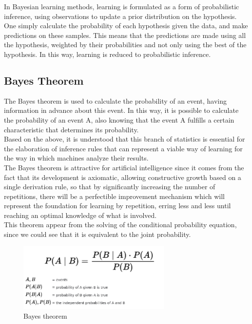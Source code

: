 \documentclass[sigconf,12pt,review=false,natbib=false]{acmart}
\begin{document}
In Bayesian learning methods, learning is formulated as a form of probabilistic inference, using observations to
update a prior distribution on the hypothesis.
One simply calculate the probability of each hypothesis given the data, and make predictions on these samples.
This means that the predictions are made using all the hypothesis, weighted by their probabilities and not only
using the best of the hypothesis. In this way, learning is reduced to probabilistic inference.


\subsection{Bayes Theorem}

The Bayes theorem is used to calculate the probability of an event, having information in advance
about this event. In this way, it is possible to calculate the probability of an event A, also
knowing that the event A fulfills a certain characteristic that determines its probability. \\

Based on the above, it is understood that this branch of statistics is essential for the elaboration
of inference rules that can represent a viable way of learning for the way in which machines analyze
their results. \\

The Bayes theorem is attractive for artificial intelligence since it comes from the fact that its
development is axiomatic, allowing constructive growth based on a single derivation rule, so that by
significantly increasing the number of repetitions, there will be a perfectible improvement mechanism
which will represent the foundation for learning by repetition, erring less and less until reaching
an optimal knowledge of what is involved. \\


This theorem appear from the solving of the conditional probability equation, since we could see
that it is equivalent to the joint probability. \\

\begin{figure}[h!]
    \centering
    \includegraphics[width=3in]{bayes}
    \caption{Bayes theorem}
    \label{fig:jcp_relationship}
\end{figure}
\end{document}
